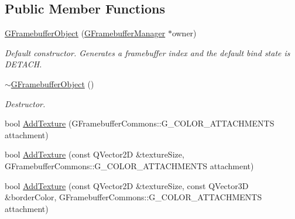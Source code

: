 \subsection*{Public Member Functions}
\begin{DoxyCompactItemize}
\item 
\mbox{\label{class_geometry_engine_1_1_geometry_buffer_1_1_g_framebuffer_object_a76db9c564c3fbc5a4381793c77979b36}} 
\mbox{\hyperlink{class_geometry_engine_1_1_geometry_buffer_1_1_g_framebuffer_object_a76db9c564c3fbc5a4381793c77979b36}{G\+Framebuffer\+Object}} (\mbox{\hyperlink{class_geometry_engine_1_1_geometry_buffer_1_1_g_framebuffer_manager}{G\+Framebuffer\+Manager}} $\ast$owner)
\begin{DoxyCompactList}\small\item\em Default constructor. Generates a framebuffer index and the default bind state is D\+E\+T\+A\+CH. \end{DoxyCompactList}\item 
\mbox{\label{class_geometry_engine_1_1_geometry_buffer_1_1_g_framebuffer_object_a2a84a267a1b0e36156af524b638c200a}} 
\mbox{\hyperlink{class_geometry_engine_1_1_geometry_buffer_1_1_g_framebuffer_object_a2a84a267a1b0e36156af524b638c200a}{$\sim$\+G\+Framebuffer\+Object}} ()
\begin{DoxyCompactList}\small\item\em Destructor. \end{DoxyCompactList}\item 
bool \mbox{\hyperlink{class_geometry_engine_1_1_geometry_buffer_1_1_g_framebuffer_object_a74233a30be93e8b25f3a957629e47f6e}{Add\+Texture}} (G\+Framebuffer\+Commons\+::\+G\+\_\+\+C\+O\+L\+O\+R\+\_\+\+A\+T\+T\+A\+C\+H\+M\+E\+N\+TS attachment)
\item 
bool \mbox{\hyperlink{class_geometry_engine_1_1_geometry_buffer_1_1_g_framebuffer_object_a2df48d160d1fe45479ec0bbd8585e07c}{Add\+Texture}} (const Q\+Vector2D \&texture\+Size, G\+Framebuffer\+Commons\+::\+G\+\_\+\+C\+O\+L\+O\+R\+\_\+\+A\+T\+T\+A\+C\+H\+M\+E\+N\+TS attachment)
\item 
bool \mbox{\hyperlink{class_geometry_engine_1_1_geometry_buffer_1_1_g_framebuffer_object_abc4ab65f4ab2f63771d2dc1e36b4d45d}{Add\+Texture}} (const Q\+Vector2D \&texture\+Size, const Q\+Vector3D \&border\+Color, G\+Framebuffer\+Commons\+::\+G\+\_\+\+C\+O\+L\+O\+R\+\_\+\+A\+T\+T\+A\+C\+H\+M\+E\+N\+TS attachment)

\end{DoxyCompactItemize}
